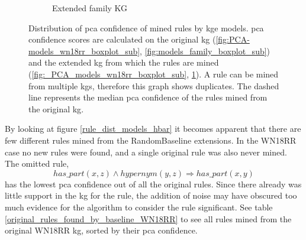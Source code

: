 \begin{figure}[htbp]
\begin{subfigure}{.5\textwidth}
  \caption{Extended family KG}
  \label{fig:_PCA_models_family_boxplot_sub}
\end{subfigure}
\caption[Dist. of PCA conf. rules by KGE models]{Distribution of \gls{pca} confidence of mined rules by \gls{kge} models. \gls{pca} confidence scores are calculated on the original \gls{kg} (\ref{fig:PCA-models_wn18rr_boxplot_sub}, \ref{fig:models_family_boxplot_sub}) and the extended \gls{kg} from which the rules are mined (\ref{fig:_PCA_models_wn18rr_boxplot_sub}, \ref{fig:_PCA_models_family_boxplot_sub}). A rule can be mined from multiple \glspl{kg}, therefore this graph shows duplicates. The dashed line represents the median \gls{pca} confidence of the rules mined from the original \gls{kg}.}
\label{fig:PCA_models_boxplot}
\end{figure}

By looking at figure \ref{rule_dist_models_hbar} it becomes apparent that there are few different rules mined from the RandomBaseline extensions. In the WN18RR case no new rules were found, and a single original rule was also never mined. The omitted rule,
\[ has\_part(x, z) \wedge hypernym(y, z) \Rightarrow has\_part(x, y)\]
has the lowest \gls{pca} confidence out of all the original rules. Since there already was little support in the \gls{kg} for the rule, the addition of noise may have obscured too much evidence for the algorithm to consider the rule significant. See table \ref{original_rules_found_by_baseline_WN18RR} to see all rules mined from the original WN18RR \gls{kg}, sorted by their \gls{pca} confidence.

